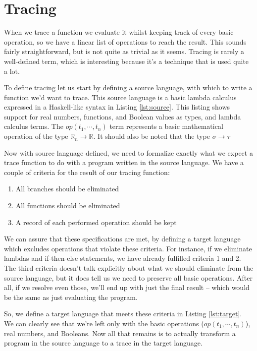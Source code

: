 \section{Tracing}
    When we trace a function we evaluate it whilst keeping track of every basic operation, so we have a linear list of operations to reach the result.
    This sounds fairly straightforward, but is not quite as trivial as it seems.
    Tracing is rarely a well-defined term, which is interesting because it's a technique that is used quite a lot.

    To define tracing let us start by defining a source language, with which to write a function we'd want to trace.
    This source language is a basic lambda calculus expressed in a Haskell-like syntax in Listing \ref{lst:source}.
    This listing shows support for real numbers, functions, and Boolean values as types, and lambda calculus terms.
    The $op(t_1,\dotsb,t_n)$ term represents a basic mathematical operation of the type $\mathbb{R}_n\to\mathbb{R}$.
    It should also be noted that the type $\sigma\to\tau$

    Now with source language defined, we need to formalize exactly what we expect a trace function to do with a program written in the source language.
    We have a couple of criteria for the result of our tracing function:
    \begin{enumerate}
        \item All branches should be eliminated
        \item All functions should be eliminated
        \item A record of each performed operation should be kept
    \end{enumerate}
    We can assure that these specifications are met, by defining a target language which excludes operations that violate these criteria.
    For instance, if we eliminate lambdas and if-then-else statements, we have already fulfilled criteria 1 and 2.
    The third criteria doesn't talk explicitly about what we should eliminate from the source language, but it does tell us we need to preserve all basic operations.
    After all, if we resolve even those, we'll end up with just the final result -- which would be the same as just evaluating the program.

    So, we define a target language that meets these criteria in Listing \ref{lst:target}.
    We can clearly see that we're left only with the basic operations ($op(t_1,\dotsb,t_n)$), real numbers, and Booleans.
    Now all that remains is to actually transform a program in the source language to a trace in the target language.

